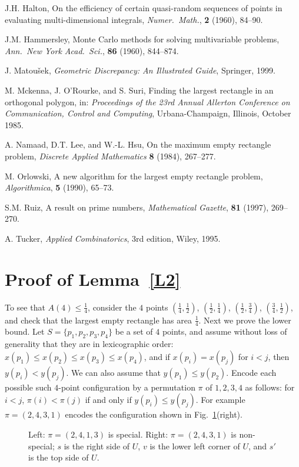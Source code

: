 \documentclass[11pt]{article}
\begin{document}
\begin{thebibliography}{9}
J.H. Halton,
On the efficiency of certain quasi-random sequences of points in
evaluating multi-dimensional integrals, 
\emph{Numer.\ Math.}, 
\textbf{2} (1960), 84--90.

J.M. Hammersley,
Monte Carlo methods for solving multivariable problems,
\emph{Ann.\ New York Acad.\ Sci.}, 
\textbf{86} (1960), 844--874.

J. Matou\v{s}ek,
\emph{Geometric Discrepancy: An Illustrated Guide},
Springer, 1999.

M. Mckenna, J. O'Rourke, and S. Suri,
Finding the largest rectangle in an orthogonal polygon,
in: \emph{Proceedings of the 23rd Annual Allerton Conference on Communication,
  Control and Computing}, Urbana-Champaign, Illinois, October 1985. 

A. Namaad, D.T. Lee, and  W.-L. Hsu,
On the maximum empty rectangle problem,
\emph{Discrete Applied Mathematics}
\textbf{8} (1984), 267--277.

M. Orlowski,
A new algorithm for the largest empty rectangle problem,
\emph{Algorithmica},
\textbf{5} (1990), 65--73.

S.M. Ruiz,
A result on prime numbers,
\emph{Mathematical Gazette},
\textbf{81} (1997), 269--270.

A. Tucker,
\emph{Applied Combinatorics}, 3rd edition,
Wiley, 1995.

\end{thebibliography}




\appendix


\section{Proof of Lemma~\ref{L2}} \label{app:L2}

To see that $A(4) \leq \frac{1}{4}$, consider the $4$ points
$(\frac{1}{4},\frac{1}{2})$, 
$(\frac{1}{2},\frac{1}{4})$,
$(\frac{1}{2},\frac{3}{4})$,
$(\frac{3}{4},\frac{1}{2})$,
and check that the largest empty rectangle has area  $\frac{1}{4}$. 
Next we prove the lower bound. 
Let $S=\{p_1,p_2,p_3,p_4\}$ be a set of $4$ points, and assume without
loss of generality that they are in lexicographic order: 
$x(p_1) \leq x(p_2) \leq x(p_3) \leq x(p_4)$,  
and if $x(p_i) = x(p_j)$ for $i<j$, then $y(p_i)< y(p_j)$. 
We can also assume that $y(p_1) \leq y(p_2)$. Encode each possible such
$4$-point configuration by a permutation $\pi$ of $1,2,3,4$ as follows:
for $i<j$, $\pi(i) <\pi(j)$ if and only if $y(p_i) \leq y(p_j)$. 
For example $\pi=(2,4,3,1)$ encodes the configuration shown in
Fig.~\ref{f1}(right). 
\begin{figure} [htb]
\centerline{\epsfxsize=4in }
\caption{\small Left: $\pi=(2,4,1,3)$ is special.
Right: $\pi=(2,4,3,1)$ is non-special; $s$ is the right side of $U$, $v$
is the lower left corner of $U$, and $s'$ is the top side of $U$.} 
\label{f1}
\end{figure}
\end{document}
